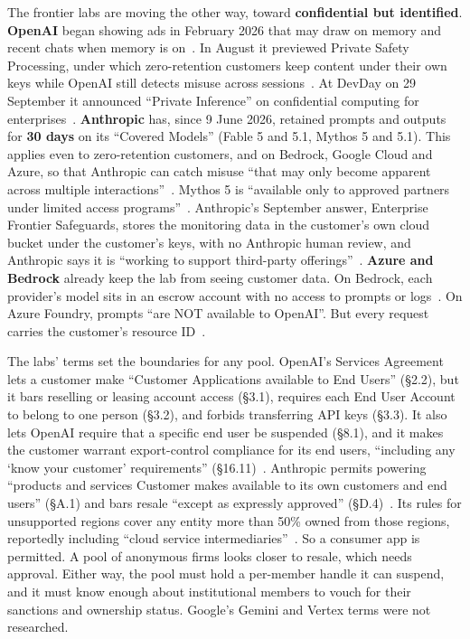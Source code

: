 \documentclass[10pt,a4paper]{article}
\begin{document}
The frontier labs are moving the other way, toward \textbf{confidential but identified}. \textbf{OpenAI} began showing ads in February 2026 that may draw on memory and recent chats when memory is on~\cite{openai-help-ads-in}. In August it previewed Private Safety Processing, under which zero-retention customers keep content under their own keys while OpenAI still detects misuse across sessions~\cite{tnw-private-safety-process}. At DevDay on 29 September it announced ``Private Inference'' on confidential computing for enterprises~\cite{venturebeat-openai-private}. \textbf{Anthropic} has, since 9 June 2026, retained prompts and outputs for \textbf{30 days} on its ``Covered Models'' (Fable 5 and 5.1, Mythos 5 and 5.1). This applies even to zero-retention customers, and on Bedrock, Google Cloud and Azure, so that Anthropic can catch misuse ``that may only become apparent across multiple interactions''~\cite{claude-help-covered-models}. Mythos 5 is ``available only to approved partners under limited access programs''~\cite{claude-support-covered-mod}. Anthropic's September answer, Enterprise Frontier Safeguards, stores the monitoring data in the customer's own cloud bucket under the customer's keys, with no Anthropic human review, and Anthropic says it is ``working to support third-party offerings''~\cite{anthropic-enterprise-front}. \textbf{Azure and Bedrock} already keep the lab from seeing customer data. On Bedrock, each provider's model sits in an escrow account with no access to prompts or logs~\cite{aws-re-post-bedrock}. On Azure Foundry, prompts ``are NOT available to OpenAI''. But every request carries the customer's resource ID~\cite{microsoft-learn-azure-open}.

The labs' terms set the boundaries for any pool. OpenAI's Services Agreement lets a customer make ``Customer Applications available to End Users'' (\S{}2.2), but it bars reselling or leasing account access (\S{}3.1), requires each End User Account to belong to one person (\S{}3.2), and forbids transferring API keys (\S{}3.3). It also lets OpenAI require that a specific end user be suspended (\S{}8.1), and it makes the customer warrant export-control compliance for its end users, ``including any `know your customer' requirements'' (\S{}16.11)~\cite{openai-services-agreement}. Anthropic permits powering ``products and services Customer makes available to its own customers and end users'' (\S{}A.1) and bars resale ``except as expressly approved'' (\S{}D.4)~\cite{anthropic-commercial-terms}. Its rules for unsupported regions cover any entity more than 50\% owned from those regions, reportedly including ``cloud service intermediaries''~\cite{anthropic-unsupported-regi}. So a consumer app is permitted. A pool of anonymous firms looks closer to resale, which needs approval. Either way, the pool must hold a per-member handle it can suspend, and it must know enough about institutional members to vouch for their sanctions and ownership status. Google's Gemini and Vertex terms were not researched.
\end{document}
